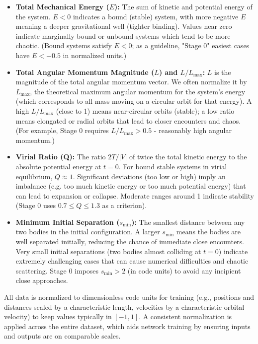\documentclass{article}
\begin{document}
\begin{itemize}
    \item \textbf{Total Mechanical Energy ($E$):} The sum of kinetic and potential energy of the system.  $E<0$ indicates a bound (stable) system, 
    with more negative $E$ meaning a deeper gravitational well (tighter binding).  Values near zero indicate marginally bound or unbound 
    systems which tend to be more chaotic.  (Bound systems satisfy $E<0$; as a guideline, "Stage 0" easiest cases have $E<-0.5$ in normalized units.)


    \item \textbf{Total Angular Momentum Magnitude ($L$) and $L/L_{\max}$:} $L$ is the magnitude of the total angular momentum vector. 
    We often normalize it by $L_{\max}$, the theoretical maximum angular momentum for the system's energy (which corresponds to 
    all mass moving on a circular orbit for that energy). A high $L/L_{\max}$ (close to 1) means near-circular orbits (stable); 
    a low ratio means elongated or radial orbits that lead to closer encounters and chaos. (For example, Stage 0 requires $L/L_{\max}>0.5$ - 
    reasonably high angular momentum.)



    \item \textbf{Virial Ratio (Q):} The ratio $2T/|V|$ of twice the total kinetic energy to the absolute potential energy at $t=0$.  
    For bound stable systems in virial equilibrium, $Q \approx 1$. Significant deviations (too low or high) imply an imbalance (e.g. 
    too much kinetic energy or too much potential energy) that can lead to expansion or collapse.  Moderate ranges around 1 indicate 
    stability (Stage 0 uses $0.7 \le Q \le 1.3$ as a criterion). 



    \item \textbf{Minimum Initial Separation ($s_{\min}$):} The smallest distance between any two bodies in the initial configuration. 
    A larger $s_{\min}$ means the bodies are well separated initially, reducing the chance of immediate close encounters.  
    Very small initial separations (two bodies almost colliding at $t=0$) indicate extremely challenging cases that can cause 
    numerical difficulties and chaotic scattering.  Stage 0 imposes $s_{\min}>2$ (in code units) to avoid any incipient close approaches. 
\end{itemize}

All data is normalized to dimensionless code units for training (e.g., positions and distances scaled by a characteristic length, velocities by a characteristic orbital velocity) to keep values typically in $[-1,1]$.  A consistent normalization is applied across the entire dataset, which aids network training by ensuring inputs and outputs are on comparable scales. 
\end{document}
